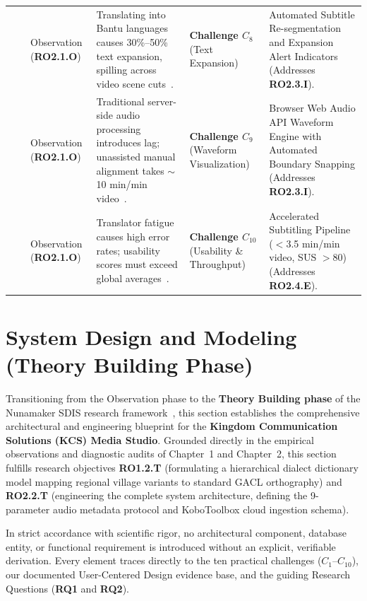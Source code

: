 \documentclass[conference]{IEEEtran}
\begin{document}
\begin{table}[t]
\begin{tabular}{p{1.1cm} p{1.4cm} >{\raggedright\arraybackslash}p{2.2cm} >{\raggedright\arraybackslash}p{4.2cm} >{\raggedright\arraybackslash}p{2.6cm} >{\raggedright\arraybackslash}p{4.0cm}}
\addlinespace
& & Observation (\textbf{RO2.1.O}) & Translating into Bantu languages causes 30\%--50\% text expansion, spilling across video scene cuts~\cite{tadadjeu1979alphabet}. & \textbf{Challenge $C_8$} (Text Expansion) & Automated Subtitle Re-segmentation and Expansion Alert Indicators (Addresses \textbf{RO2.3.I}). \\
\addlinespace
& & Observation (\textbf{RO2.1.O}) & Traditional server-side audio processing introduces lag; unassisted manual alignment takes $\sim$10 min/min video~\cite{w3c2021webaudio}. & \textbf{Challenge $C_9$} (Waveform Visualization) & Browser Web Audio API Waveform Engine with Automated Boundary Snapping (Addresses \textbf{RO2.3.I}). \\
\addlinespace
& & Observation (\textbf{RO2.1.O}) & Translator fatigue causes high error rates; usability scores must exceed global averages~\cite{norman1986user}. & \textbf{Challenge $C_{10}$} (Usability \& Throughput) & Accelerated Subtitling Pipeline ($<$3.5 min/min video, SUS $>80$) (Addresses \textbf{RO2.4.E}). \\
\bottomrule
\end{tabular}
\end{table}

\section{System Design and Modeling (Theory Building Phase)}
\label{sec:design}

Transitioning from the Observation phase to the \textbf{Theory Building phase} of the Nunamaker SDIS research framework~\cite{nunamaker1990systems}, this section establishes the comprehensive architectural and engineering blueprint for the \textbf{Kingdom Communication Solutions (KCS) Media Studio}. Grounded directly in the empirical observations and diagnostic audits of Chapter~1 and Chapter~2, this section fulfills research objectives \textbf{RO1.2.T} (formulating a hierarchical dialect dictionary model mapping regional village variants to standard GACL orthography) and \textbf{RO2.2.T} (engineering the complete system architecture, defining the 9-parameter audio metadata protocol and KoboToolbox cloud ingestion schema).

In strict accordance with scientific rigor, no architectural component, database entity, or functional requirement is introduced without an explicit, verifiable derivation. Every element traces directly to the ten practical challenges ($C_1$--$C_{10}$), our documented User-Centered Design evidence base, and the guiding Research Questions (\textbf{RQ1} and \textbf{RQ2}).
\end{document}
